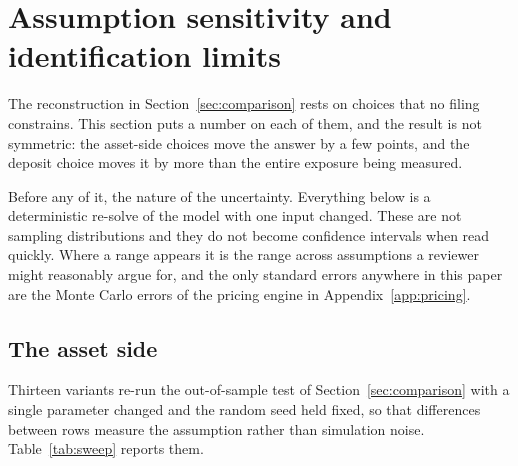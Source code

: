 \section{Assumption sensitivity and identification limits}
\label{sec:sensitivity}

The reconstruction in Section~\ref{sec:comparison} rests on choices that no filing
constrains. This section puts a number on each of them, and the result is not
symmetric: the asset-side choices move the answer by a few points, and the deposit
choice moves it by more than the entire exposure being measured.

Before any of it, the nature of the uncertainty. Everything below is a deterministic
re-solve of the model with one input changed. These are not sampling distributions
and they do not become confidence intervals when read quickly. Where a range appears
it is the range across assumptions a reviewer might reasonably argue for, and the
only standard errors anywhere in this paper are the Monte Carlo errors of the pricing
engine in Appendix~\ref{app:pricing}.

\subsection{The asset side}

Thirteen variants re-run the out-of-sample test of Section~\ref{sec:comparison} with
a single parameter changed and the random seed held fixed, so that differences
between rows measure the assumption rather than simulation noise.
Table~\ref{tab:sweep} reports them.

